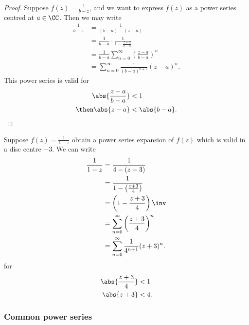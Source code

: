 \documentclass[12pt, a4paper]{article}
\begin{document}
\begin{proof}
    Suppose \(f(z) = \frac{1}{b-z}\), and we want to express \(f(z)\) as a power series centred at \(a \in \CC\). Then we may write 
    \[\begin{aligned}
        \frac{1}{b-z} &= \frac{1}{(b-a)-(z-a)} \\
        &= \frac{1}{b-a} \cdot \frac{1}{1-\frac{z-a}{b-a}} \\
        &= \frac{1}{b-a} \sum_{n=0}^{\infty} \left( \frac{z-a}{b-a} \right)^n \\
        &= \sum_{n=0}^{\infty} \frac{1}{(b-a)^{n+1}} (z-a)^n.
    \end{aligned}\]
    This power series is valid for 
    \[\begin{aligned}
        \abs{\frac{z-a}{b-a}} &< 1 \\
        \then \abs{z-a} &< \abs{b-a}.
    \end{aligned}\]
\end{proof}

\begin{example}
    Suppose \(f(z) = \frac{1}{1-z}\) obtain a power series expansion of \(f(z)\) which is valid in a disc centre \(-3\). We can write 
    \[\begin{aligned}
        \frac{1}{1-z} &= \frac{1}{4-(z+3)} \\
        &= \frac{1}{1- \left( \frac{z+3}{4} \right)} \\
        &= \left( 1- \frac{z+3}{4} \right)\inv \\
        &= \sum_{n=0}^{\infty} \left( \frac{z+3}{4} \right)^n \\
        &= \sum_{n=0}^{\infty} \frac{1}{4^{n+1}} (z+3)^n.
    \end{aligned}\] 
    for 
    \[\begin{aligned}
        \abs{\frac{z+3}{4}}&<1 \\
        \abs{z+3} &<4.
    \end{aligned}\]
\end{example}

\subsubsection{Common power series}
\end{document}
